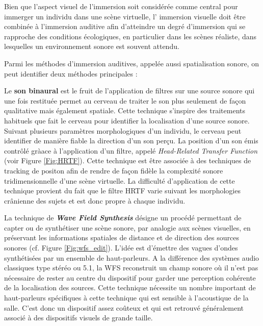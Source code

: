 Bien que l'aspect visuel de l'immersion soit considérée comme central pour immerger un individu dans une scène virtuelle, l' immersion visuelle doit être combinée à l'immersion auditive afin d'atteindre un degré d'immersion qui se rapproche des conditions écologiques, en particulier dans les scènes réaliste, dans lesquelles un environnement sonore est souvent attendu.

Parmi les méthodes d'immersion auditives, appelée aussi spatialisation sonore, on peut identifier deux méthodes principales :

Le \textbf{son binaural} est le fruit de l'application de filtres sur une source sonore qui une fois restituée permet au cerveau de traiter le son plus seulement de façon qualitative mais également spatiale. Cette technique s'inspire des traitements habituels que fait le cerveau pour identifier la localisation d'une source sonore. Suivant plusieurs paramètres morphologiques d'un individu, le cerveau peut identifier de manière fiable la direction d'un son perçu. La position d'un son émis contrôlé gràace à l'application d'un filtre, appelé \textit{Head-Related Transfer Function} (voir Figure \ref{Fig:HRTF}). Cette technique est être associée à des techniques de tracking de positon afin de rendre de façon fidèle la complexité sonore tridimensionnelle d'une scène virtuelle. La difficulté d'application de cette technique provient du fait que le filtre HRTF varie suivant les morphologies crânienne des sujets et est donc propre à chaque individu.

La technique de \textit{\textbf{Wave Field Synthesis}} désigne un procédé permettant de capter ou de synthétiser une scène sonore, par analogie aux scènes visuelles, en préservant les informations spatiales de distance et de direction des sources sonores (cf. Figure \ref{Fig:wfs_edit}). L'idée est d'émettre des vagues d'ondes synthétisées par un ensemble de haut-parleurs. A la différence des systèmes audio classiques type stéréo ou 5.1, la WFS reconstruit un champ sonore où il n'est pas nécessaire de rester au centre du dispositif pour garder une perception cohérente de la localisation des sources.
Cette technique nécessite un nombre important de haut-parleurs spécifiques à cette technique qui est sensible à l'acoustique de la salle. C'est donc un dispositif assez coûteux et qui est retrouvé généralement associé à des dispositifs visuels de grande taille.

